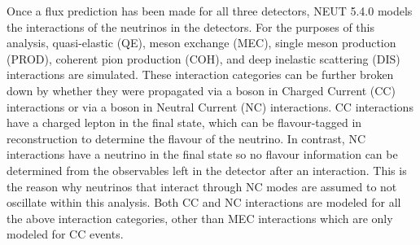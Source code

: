 Once a flux prediction has been made for all three detectors, NEUT 5.4.0 \cite{Hayato2021, neut} models the interactions of the neutrinos in the detectors. For the purposes of this analysis, quasi-elastic (QE), meson exchange (MEC), single meson production (PROD), coherent pion production (COH), and deep inelastic scattering (DIS) interactions are simulated. These interaction categories can be further broken down by whether they were propagated via a  boson in Charged Current (CC) interactions or via a  boson in Neutral Current (NC) interactions. CC interactions have a charged lepton in the final state, which can be flavour-tagged in reconstruction to determine the flavour of the neutrino. In contrast, NC interactions have a neutrino in the final state so no flavour information can be determined from the observables left in the detector after an interaction. This is the reason why neutrinos that interact through NC modes are assumed to not oscillate within this analysis. Both CC and NC interactions are modeled for all the above interaction categories, other than MEC interactions which are only modeled for CC events. 

